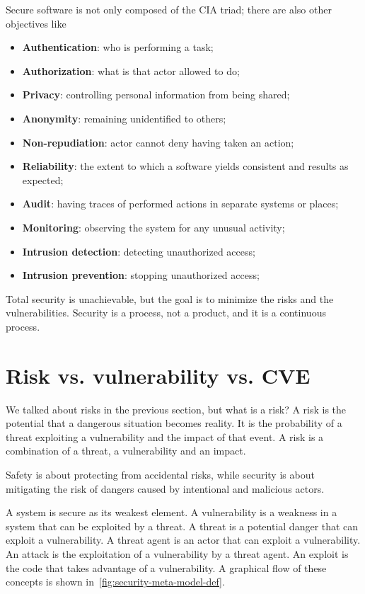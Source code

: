 Secure software is not only composed of the CIA triad; there are also other objectives like~\cite{st-slides}
\begin{itemize}
  \item \textbf{Authentication}: who is performing a task;
  \item \textbf{Authorization}: what is that actor allowed to do;
  \item \textbf{Privacy}: controlling personal information from being shared;
  \item \textbf{Anonymity}: remaining unidentified to others;
  \item \textbf{Non-repudiation}: actor cannot deny having taken an action;
  \item \textbf{Reliability}: the extent to which a software yields consistent and results as expected;
  \item \textbf{Audit}: having traces of performed actions in separate systems or places;
  \item \textbf{Monitoring}: observing the system for any unusual activity;
  \item \textbf{Intrusion detection}: detecting unauthorized access;
  \item \textbf{Intrusion prevention}: stopping unauthorized access;
\end{itemize}

Total security is unachievable, but the goal is to minimize the risks and the vulnerabilities. Security is a process, not a product, and it is a continuous process.~\cite{st-slides}

\section{Risk vs. vulnerability vs. CVE}

We talked about risks in the previous section, but what is a risk? A risk is the potential that a dangerous situation becomes reality. It is the probability of a threat exploiting a vulnerability and the impact of that event. A risk is a combination of a threat, a vulnerability and an impact.

Safety is about protecting from accidental risks, while security is about mitigating the risk of dangers caused by intentional and malicious actors.

A system is secure as its weakest element. A vulnerability is a weakness in a system that can be exploited by a threat. A threat is a potential danger that can exploit a vulnerability. A threat agent is an actor that can exploit a vulnerability. An attack is the exploitation of a vulnerability by a threat agent. An exploit is the code that takes advantage of a vulnerability. A graphical flow of these concepts is shown in~\cref{fig:security-meta-model-def}.

